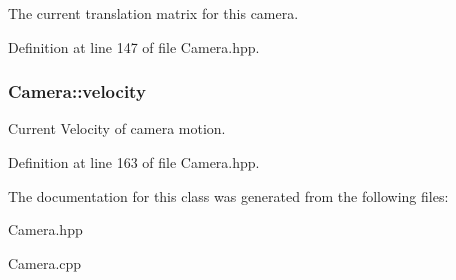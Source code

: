 \-The current translation matrix for this camera. 



\-Definition at line 147 of file \-Camera.\-hpp.

\hypertarget{class_camera_a5b95c890f213db50f321380108b17ea1}{
\subsubsection[{velocity}]{ {\bf \-Camera\-::velocity}}}\label{class_camera_a5b95c890f213db50f321380108b17ea1}


\-Current \-Velocity of camera motion. 



\-Definition at line 163 of file \-Camera.\-hpp.



\-The documentation for this class was generated from the following files\-:\begin{DoxyCompactItemize}
\item 
\-Camera.\-hpp\item 
\-Camera.\-cpp\end{DoxyCompactItemize}
